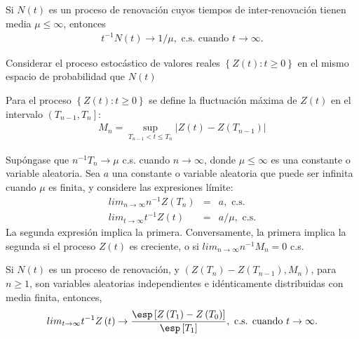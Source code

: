 \begin{Coro}
Si $N\left(t\right)$ es un proceso de renovaci\'on cuyos tiempos de inter-renovaci\'on tienen media $\mu\leq\infty$, entonces
\begin{eqnarray}
t^{-1}N\left(t\right)\rightarrow 1/\mu,\textrm{ c.s. cuando }t\rightarrow\infty.
\end{eqnarray}

\end{Coro}


Considerar el proceso estoc\'astico de valores reales $\left\{Z\left(t\right):t\geq0\right\}$ en el mismo espacio de probabilidad que $N\left(t\right)$

\begin{Def}
Para el proceso $\left\{Z\left(t\right):t\geq0\right\}$ se define la fluctuaci\'on m\'axima de $Z\left(t\right)$ en el intervalo $\left(T_{n-1},T_{n}\right]$:
\begin{eqnarray*}
M_{n}=\sup_{T_{n-1}<t\leq T_{n}}|Z\left(t\right)-Z\left(T_{n-1}\right)|
\end{eqnarray*}
\end{Def}

\begin{Teo}
Sup\'ongase que $n^{-1}T_{n}\rightarrow\mu$ c.s. cuando $n\rightarrow\infty$, donde $\mu\leq\infty$ es una constante o variable aleatoria. Sea $a$ una constante o variable aleatoria que puede ser infinita cuando $\mu$ es finita, y considere las expresiones l\'imite:
\begin{eqnarray}
lim_{n\rightarrow\infty}n^{-1}Z\left(T_{n}\right)&=&a,\textrm{ c.s.}\\
lim_{t\rightarrow\infty}t^{-1}Z\left(t\right)&=&a/\mu,\textrm{ c.s.}
\end{eqnarray}
La segunda expresi\'on implica la primera. Conversamente, la primera implica la segunda si el proceso $Z\left(t\right)$ es creciente, o si $lim_{n\rightarrow\infty}n^{-1}M_{n}=0$ c.s.
\end{Teo}

\begin{Coro}
Si $N\left(t\right)$ es un proceso de renovaci\'on, y $\left(Z\left(T_{n}\right)-Z\left(T_{n-1}\right),M_{n}\right)$, para $n\geq1$, son variables aleatorias independientes e id\'enticamente distribuidas con media finita, entonces,
\begin{eqnarray}
lim_{t\rightarrow\infty}t^{-1}Z\left(t\right)\rightarrow\frac{\esp\left[Z\left(T_{1}\right)-Z\left(T_{0}\right)\right]}{\esp\left[T_{1}\right]},\textrm{ c.s. cuando  }t\rightarrow\infty.
\end{eqnarray}
\end{Coro}

